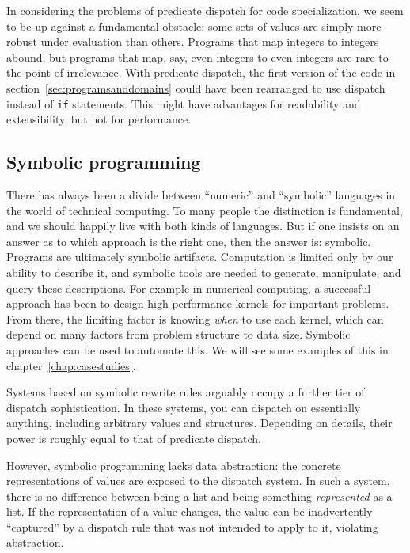 In considering the problems of predicate dispatch for code specialization,
we seem to be up against a fundamental obstacle: some sets of values are
simply more robust under evaluation than others.
Programs that map integers to integers abound, but programs that map, say,
even integers to even integers are rare to the point of irrelevance.
With predicate dispatch, the first version of the code in
section~\ref{sec:programsanddomains} could have been rearranged to use
dispatch instead of \texttt{if} statements.
This might have advantages for readability and extensibility, but not for
performance.


\subsection{Symbolic programming}

There has always been a divide between ``numeric'' and ``symbolic''
languages in the world of technical computing.
To many people the distinction is fundamental, and we should happily live
with both kinds of languages.
But if one insists on an answer as to which approach is the right one,
then the answer is: symbolic.
Programs are ultimately symbolic artifacts.
Computation is limited only by our ability to describe it, and
symbolic tools are needed to generate, manipulate, and query these
descriptions.
For example in numerical computing, a successful approach has been to
design high-performance kernels for important problems.
From there, the limiting factor is knowing \emph{when} to use each
kernel, which can depend on many factors from problem structure to
data size.
Symbolic approaches can be used to automate this.
We will see some examples of this in chapter~\ref{chap:casestudies}.

Systems based on symbolic rewrite rules arguably occupy a further tier of
dispatch sophistication.
In these systems, you can dispatch on essentially anything, including arbitrary
values and structures.
Depending on details, their power is roughly equal to that of predicate
dispatch.

However, symbolic programming lacks data abstraction: the concrete
representations of values are exposed to the dispatch system.
In such a system, there is no difference between being a list and being
something \emph{represented} as a list.
If the representation of a value changes, the value can be inadvertently
``captured'' by a dispatch rule that was not intended to apply to it,
violating abstraction.

